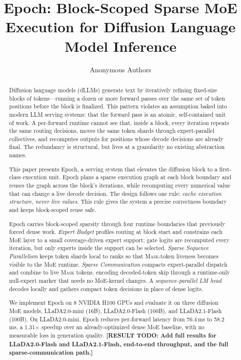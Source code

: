 \documentclass[sigconf,review,anonymous, 10pt]{acmart}
\title{Epoch: Block-Scoped Sparse MoE Execution for Diffusion Language Model Inference}
\author{Anonymous Authors}
\affiliation{\institution{Paper under submission}}
\newcommand{\resulttodo}[1]{\textcolor{todored}{\textbf{[RESULT TODO: #1]}}}
\newcommand{\sys}{Epoch}
\newcommand{\mask}{\textsc{Mask}}
\begin{document}
\begin{abstract}
Diffusion language models (dLLMs) generate text by iteratively refining fixed-size blocks of tokens---running a dozen or more forward passes over the same set of token positions before the block is finalized.
This pattern violates an assumption baked into modern LLM serving systems: that the forward pass is an atomic, self-contained unit of work.
A per-forward runtime cannot see that, inside a block, every iteration repeats the same routing decisions, moves the same token shards through expert-parallel collectives, and recomputes outputs for positions whose decode decisions are already final.
The redundancy is structural, but lives at a granularity no existing abstraction names.

This paper presents \sys, a serving system that elevates the diffusion block to a first-class execution unit.
\sys{} plans a sparse execution graph at each block boundary and reuses the graph across the block's iterations, while recomputing every numerical value that can change a live decode decision.
The design follows one rule: \emph{cache execution structure, never live values}.
This rule gives the system a precise correctness boundary and keeps block-scoped reuse safe.

\sys{} carries block-scoped sparsity through four runtime boundaries that previously forced dense work.
\emph{Expert Budget} profiles routing at block start and constrains each MoE layer to a small coverage-driven expert support; gate logits are recomputed every iteration, but only experts inside the support can be selected.
\emph{Sparse Sequence Parallelism} keeps token shards local to ranks so that \mask{}-token liveness becomes visible to the MoE runtime.
\emph{Sparse Communication} compacts expert-parallel dispatch and combine to live \mask{} tokens, encoding decoded-token skip through a runtime-only null-expert marker that needs no MoE-kernel changes.
A \emph{sequence-parallel LM head} decodes locally and gathers compact token decisions in place of dense logits.

We implement \sys{} on 8 NVIDIA H100 GPUs and evaluate it on three diffusion MoE models, LLaDA2.0-mini (16B), LLaDA2.0-Flash (100B), and LLaDA2.1-Flash (100B).
On LLaDA2.0-mini, \sys{} reduces per-forward latency from 76.4\,ms to 58.2\,ms, a 1.31$\times$ speedup over an already-optimized dense MoE baseline, with no measurable loss in generation quality.
\resulttodo{Add full results for LLaDA2.0-Flash and LLaDA2.1-Flash, end-to-end throughput, and the full sparse-communication path.}
\end{abstract}
\end{document}
